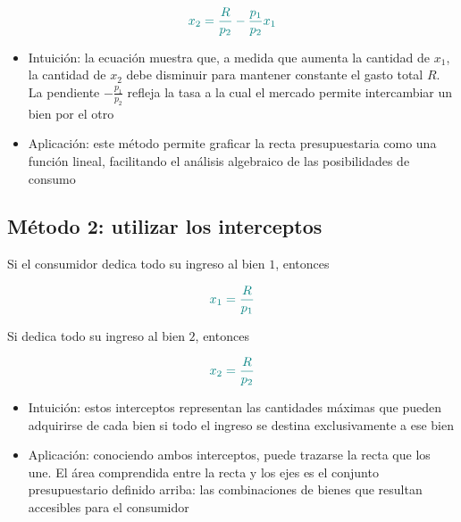 \documentclass{article}
\begin{document}
\[
{\color{teal}
x_2=\frac{R}{p_2}-\frac{p_1}{p_2}x_1
}
\]

\begin{itemize}
    \item Intuición: la ecuación muestra que, a medida que aumenta la cantidad de \(x_1\), la cantidad de \(x_2\) debe disminuir para mantener constante el gasto total \(R\). La {\color{teal}pendiente} \(-\frac{p_1}{p_2}\) refleja la {\color{teal}tasa a la cual el mercado permite intercambiar un bien por el otro}

    \item Aplicación: este método permite graficar la recta presupuestaria como una función lineal, facilitando el {\color{teal}análisis algebraico} de las posibilidades de consumo
\end{itemize}

\subsection*{Método 2: utilizar los interceptos}

Si el consumidor dedica todo su ingreso al bien \(1\), entonces

\[
{\color{teal}
x_1=\frac{R}{p_1}
}
\]

Si dedica todo su ingreso al bien \(2\), entonces

\[
{\color{teal}
x_2=\frac{R}{p_2}
}
\]

\begin{itemize}
    \item Intuición: estos interceptos representan las {\color{teal}cantidades máximas} que pueden adquirirse de cada bien si todo el ingreso se destina exclusivamente a ese bien

    \item Aplicación: conociendo ambos interceptos, puede trazarse la recta que los une. El área comprendida entre la recta y los ejes es el conjunto presupuestario definido arriba: las {\color{teal}combinaciones de bienes que resultan accesibles} para el consumidor
\end{itemize}

\begin{center}
\end{center}
\end{document}

